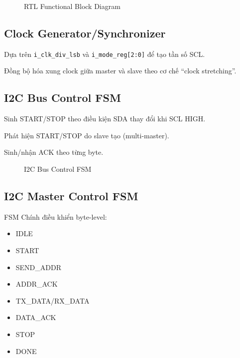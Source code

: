 \begin{figure}[H]
    \centering
    \caption{RTL Functional Block Diagram}
    \label{fig:rtl}
\end{figure}

\subsection{Clock Generator/Synchronizer}
Dựa trên \texttt{i\_clk\_div\_lsb} và \texttt{i\_mode\_reg[2:0]} để tạo tần số SCL.

Đồng bộ hóa xung clock giữa master và slave theo cơ chế ``clock stretching''.

\subsection{I2C Bus Control FSM}
Sinh START/STOP theo điều kiện SDA thay đổi khi SCL HIGH.

Phát hiện START/STOP do slave tạo (multi-master).

Sinh/nhận ACK theo từng byte.

\begin{figure}[H]
    \centering
    \caption{I2C Bus Control FSM}
    \label{fig:bus_fsm}
\end{figure}

\subsection{I2C Master Control FSM}
FSM Chính điều khiển byte-level:
\begin{itemize}[leftmargin=1.2cm]
    \item IDLE
    \item START
    \item SEND\_ADDR
    \item ADDR\_ACK
    \item TX\_DATA/RX\_DATA
    \item DATA\_ACK
    \item STOP
    \item DONE
\end{itemize}

